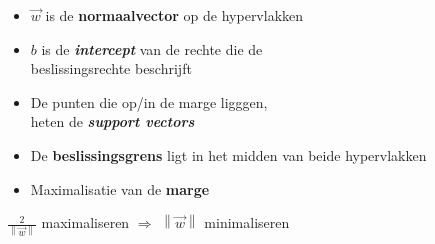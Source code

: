 \documentclass[kulak]{kulakposter}
\newcommand{\norm}[1]{\left\| #1 \right\|}
\begin{document}
\begin{multicols}{2}
\begin{multicols}{2}
			\vspace{1cm}
			
			\begin{itemize}
				\item \(\vec{w}\) is de \textbf{normaalvector} op de hypervlakken
				\item \(b\) is de \textit{\textbf{intercept}} van de rechte die de\\ beslissingsrechte beschrijft
				\item De punten die op/in de marge ligggen, \\heten de \textbf{\textit{support vectors}}
				\item De \textbf{beslissingsgrens} ligt in het midden van beide hypervlakken
				\item Maximalisatie van de \textbf{marge}\\
				
			\end{itemize}
			
			\vspace{0.5cm} \null
			
		\end{multicols}
		
		\vspace{0.5cm}
		
		\centering
		\(\frac{2}{\norm{\vec{w}}}\) maximaliseren \(\Rightarrow\) \(\norm{\vec{w}}\) minimaliseren
		
		\vfill \null
	
\end{multicols}
	
\end{document}
